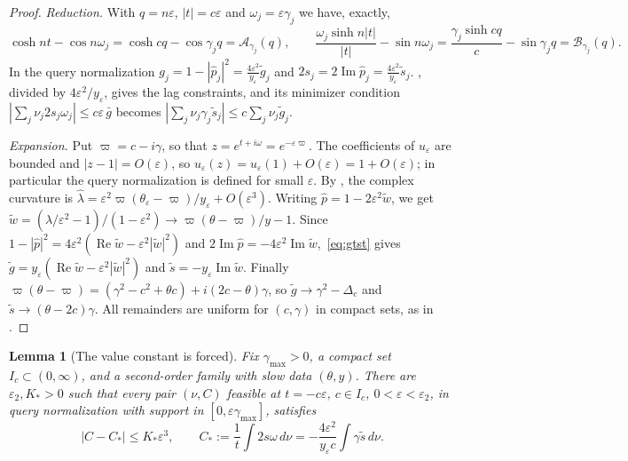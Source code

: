 \documentclass[11pt]{article}
\newtheorem{lemma}[theorem]{Lemma}
\theoremstyle{definition}
\theoremstyle{remark}
\newcommand{\cA}{\mathcal A}
\newcommand{\cB}{\mathcal B}
\newcommand{\ch}{\cosh}
\newcommand{\sh}{\sinh}
\newcommand{\Rea}{\operatorname{Re}}
\newcommand{\Ima}{\operatorname{Im}}
\newcommand{\gt}{\tilde g}
\newcommand{\st}{\tilde s}
\begin{document}
\begin{proof}
\emph{Reduction.}  With \(q=n\varepsilon\), \(|t|=c\varepsilon\) and \(\omega_j=\varepsilon\gamma_j\) we have, exactly,
\[
\ch nt-\cos n\omega_j=\ch cq-\cos\gamma_jq=\cA_{\gamma_j}(q),\qquad
\frac{\omega_j\sh n|t|}{|t|}-\sin n\omega_j=\frac{\gamma_j\sh cq}c-\sin\gamma_jq=\cB_{\gamma_j}(q).
\]
In the query normalization \(g_j=1-|\hat p_j|^2=\frac{4\varepsilon^2}{y_\varepsilon}\gt_j\) and \(2s_j=2\Ima\hat p_j=\frac{4\varepsilon^2}{y_\varepsilon}\st_j\).
, divided by \(4\varepsilon^2/y_\varepsilon\), gives the lag constraints, and its minimizer
condition \(|\sum_j\nu_j2s_j\omega_j|\le c\varepsilon\,\bar g\) becomes \(|\sum_j\nu_j\gamma_j\st_j|\le c\sum_j\nu_j\gt_j\).

\emph{Expansion.}  Put \(\varpi=c-i\gamma\), so that \(z=e^{t+i\omega}=e^{-\varepsilon\varpi}\).  The coefficients of \(u_\varepsilon\) are
bounded and \(|z-1|=O(\varepsilon)\), so \(u_\varepsilon(z)=u_\varepsilon(1)+O(\varepsilon)=1+O(\varepsilon)\); in particular the query normalization is
defined for small \(\varepsilon\).  By , the complex curvature is
\(\hat\lambda=\varepsilon^2\varpi(\theta_\varepsilon-\varpi)/y_\varepsilon+O(\varepsilon^3)\).  Writing
\(\hat p=1-2\varepsilon^2\tilde w\), we get \(\tilde w=(\hat\lambda/\varepsilon^2-1)/(1-\varepsilon^2)\to\varpi(\theta-\varpi)/y-1\).  Since
\(1-|\hat p|^2=4\varepsilon^2(\Rea\tilde w-\varepsilon^2|\tilde w|^2)\) and \(2\Ima\hat p=-4\varepsilon^2\Ima\tilde w\),~\eqref{eq:gtst} gives
\(\gt=y_\varepsilon(\Rea\tilde w-\varepsilon^2|\tilde w|^2)\) and \(\st=-y_\varepsilon\Ima\tilde w\).  Finally
\(\varpi(\theta-\varpi)=(\gamma^2-c^2+\theta c)+i(2c-\theta)\gamma\), so \(\gt\to\gamma^2-\Delta_c\) and \(\st\to(\theta-2c)\gamma\).
All remainders are uniform for \((c,\gamma)\) in compact sets, as in .
\end{proof}

\begin{lemma}[The value constant is forced]\label{lem:Cforced}
Fix \(\gamma_{\max}>0\), a compact set \(I_c\subset(0,\infty)\), and a
second-order family with slow data \((\theta,y)\).  There are
\(\varepsilon_2,K_*>0\) such that every pair \((\nu,C)\) feasible at
\(t=-c\varepsilon\), \(c\in I_c\), \(0<\varepsilon<\varepsilon_2\), in query
normalization with support in \([0,\varepsilon\gamma_{\max}]\), satisfies
\[
|C-C_*|\le K_*\varepsilon^3,\qquad
C_*:=\frac1t\int2s\omega\,d\nu
=-\frac{4\varepsilon^2}{y_\varepsilon c}\int\gamma\st\,d\nu.
\]
\end{lemma}
\end{document}
